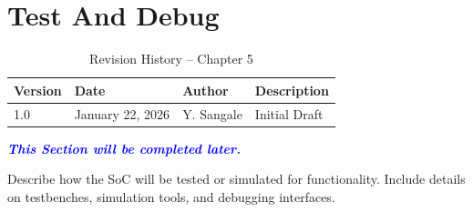 
\chapter{Test And Debug}

\begin{table}[H]
\caption{Revision History – Chapter 5}
\centering
\begin{tabular}{llll}
\toprule
Version & Date & Author & Description \\
\midrule
1.0 & January 22, 2026 & Y. Sangale & Initial Draft \\
\bottomrule
\end{tabular}
\end{table}

\textcolor{blue}{\textbf{\textit{This Section will be completed later.}}}

Describe how the SoC will be tested or simulated for functionality. Include details on testbenches, simulation tools, and debugging interfaces. 
